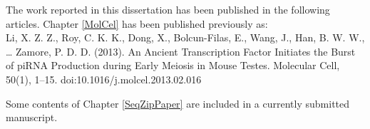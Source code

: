 \prefaceSection{}

The work reported in this dissertation has been published in the following articles.
Chapter \ref{MolCel} has been published previously as:\\
Li, X. Z. Z., Roy, C. K. K., Dong, X., Bolcun-Filas, E., Wang, J., Han, B. W. W., … Zamore, P. D. D. (2013). An Ancient Transcription Factor Initiates the Burst of piRNA Production during Early Meiosis in Mouse Testes. Molecular Cell, 50(1), 1–15. doi:10.1016/j.molcel.2013.02.016

Some contents of Chapter \ref{SeqZipPaper} are included in a currently submitted manuscript. 

\clearpage